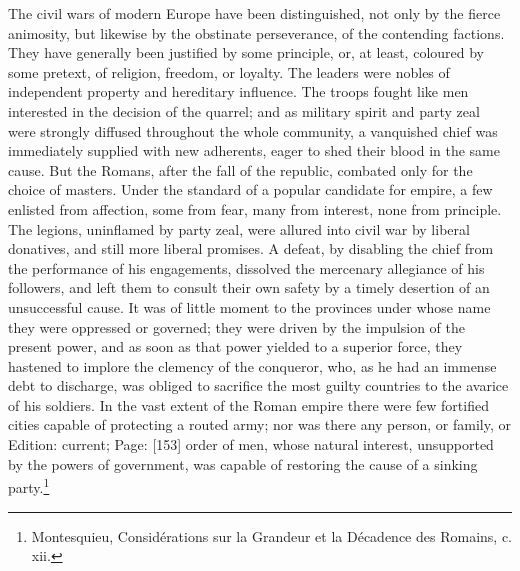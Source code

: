 The civil wars of modern Europe have been distinguished, not only by the fierce animosity, but likewise by the obstinate perseverance, of the contending factions. They have generally been justified by some principle, or, at least, coloured by some pretext, of religion, freedom, or loyalty. The leaders were nobles of independent property and hereditary influence. The troops fought like men interested in the decision of the quarrel; and as military spirit and party zeal were strongly diffused throughout the whole community, a vanquished chief was immediately supplied with new adherents, eager to shed their blood in the same cause. But the Romans, after the fall of the republic, combated only for the choice of masters. Under the standard of a popular candidate for empire, a few enlisted from affection, some from fear, many from interest, none from principle. The legions, uninflamed by party zeal, were allured into civil war by liberal donatives, and still more liberal promises. A defeat, by disabling the chief from the performance of his engagements, dissolved the mercenary allegiance of his followers, and left them to consult their own safety by a timely desertion of an unsuccessful cause. It was of little moment to the provinces under whose name they were oppressed or governed; they were driven by the impulsion of the present power, and as soon as that power yielded to a superior force, they hastened to implore the clemency of the conqueror, who, as he had an immense debt to discharge, was obliged to sacrifice the most guilty countries to the avarice of his soldiers. In the vast extent of the Roman empire there were few fortified cities capable of protecting a routed army; nor was there any person, or family, or Edition: current; Page: [153] order of men, whose natural interest, unsupported by the powers of government, was capable of restoring the cause of a sinking party.\footnote{Montesquieu, Considérations sur la Grandeur et la Décadence des Romains, c. xii.}


